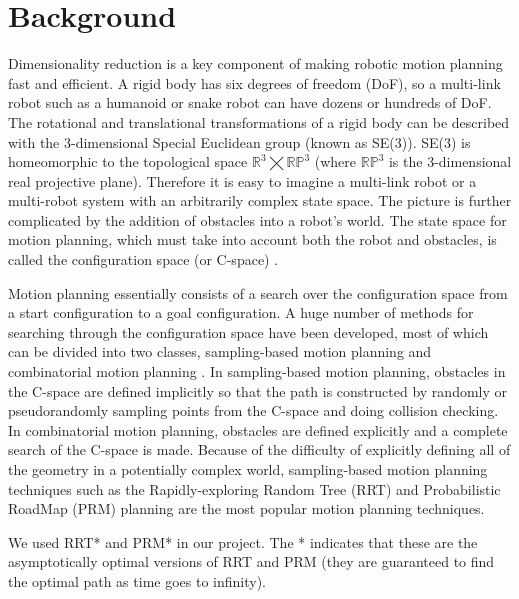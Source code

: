 \documentclass[12pt]{article}
\begin{document}
\maketitle

\section{Background}

Dimensionality reduction is a key component of making robotic motion planning
fast and efficient. A rigid body has six degrees of freedom (DoF), so a
multi-link robot such as a humanoid or snake robot can have dozens or hundreds
of DoF. The rotational and translational transformations of a rigid body can be
described with the 3-dimensional Special Euclidean group (known as SE(3)).
SE(3) is homeomorphic to the topological space $\mathbb{R}^3\bigtimes\mathbb{RP}^3$ (where $\mathbb{RP}^3$ is the
3-dimensional real projective plane). Therefore it is easy to imagine a
multi-link robot \cite{kuindersma2015optimization} or a multi-robot system \cite{alonso2015multi} with an arbitrarily complex state space. The picture is
further complicated by the addition of obstacles into a robot's world. The
state space for motion planning, which must take into account both the robot
and obstacles, is called the configuration space (or C-space) \cite{lozano1983spatial}. 

Motion planning essentially consists of a search over the configuration space
from a start configuration to a goal configuration. A huge number of methods
for searching through the configuration space have been developed, most of
which can be divided into two classes, sampling-based motion planning and
combinatorial motion planning \cite{lavalle2006planning}. In sampling-based motion planning, obstacles in
the C-space are defined implicitly so that the path is constructed by randomly
or pseudorandomly sampling points from the C-space and doing collision
checking. In combinatorial motion planning, obstacles are defined explicitly
and a complete search of the C-space is made. Because of the difficulty of
explicitly defining all of the geometry in a potentially complex world,
sampling-based motion planning techniques such as the Rapidly-exploring Random
Tree (RRT) and Probabilistic RoadMap (PRM) planning are the most popular motion
planning techniques.

We used RRT* and PRM* in our project. The * indicates that these are the
asymptotically optimal versions of RRT and PRM (they are guaranteed to find the
optimal path as time goes to infinity).
\end{document}
